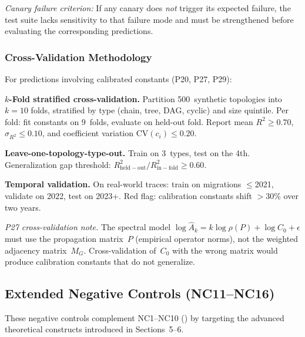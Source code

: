 \documentclass[11pt,a4paper]{article}
\theoremstyle{definition}
\begin{document}
\emph{Canary failure criterion:}  If any canary does \emph{not} trigger its
expected failure, the test suite lacks sensitivity to that failure mode and
must be strengthened before evaluating the corresponding predictions.

\subsubsection{Cross-Validation Methodology}
\label{sec:crossval}

For predictions involving calibrated constants (P20, P27, P29):

\textbf{$k$-Fold stratified cross-validation.}
Partition 500~synthetic topologies into $k = 10$ folds, stratified by type
(chain, tree, DAG, cyclic) and size quintile.  Per fold:
fit constants on 9~folds, evaluate on held-out fold.
Report mean $R^2 \geq 0.70$, $\sigma_{R^2} \leq 0.10$, and coefficient
variation $\mathrm{CV}(c_i) \leq 0.20$.

\textbf{Leave-one-topology-type-out.}
Train on 3~types, test on the 4th.  Generalization gap threshold:
$R^2_{\mathrm{held-out}} / R^2_{\mathrm{in-fold}} \geq 0.60$.

\textbf{Temporal validation.}
On real-world traces: train on migrations $\leq$2021, validate on 2022,
test on 2023+.  Red flag: calibration constants shift $>$30\% over two years.

\emph{P27 cross-validation note.}  The spectral model
$\log \hat{A}_k = k \log \rho(P) + \log C_0 + \epsilon$ must use the
propagation matrix~$P$ (empirical operator norms), not the weighted adjacency
matrix~$M_G$.  Cross-validation of~$C_0$ with the wrong matrix would produce
calibration constants that do not generalize.


\subsection{Extended Negative Controls (NC11--NC16)}
\label{sec:neg-controls-extended}

These negative controls complement NC1--NC10 ()
by targeting the advanced theoretical constructs introduced in
Sections~5--6.
\end{document}
